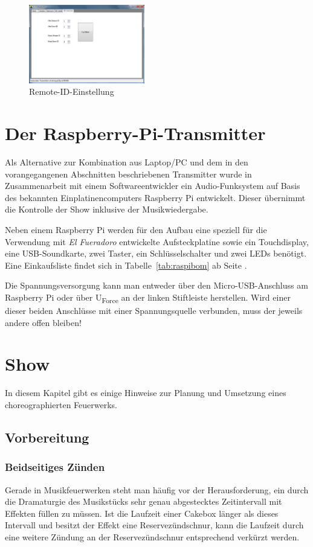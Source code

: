 \documentclass[paper=a4, parskip, numbers=noenddot, toc=listof, headsepline]{scrbook}
\newcommand{\anlage}{\emph{El Fueradoro}}
\begin{document}
			\begin{figure}[!t]
				\centering
				\includegraphics[width=0.45\textwidth]{bilder/gui-remote}
				\caption{Remote-ID-Einstellung}
				\label{fig:gui-remote}
			\end{figure}

	\chapter{Der Raspberry-Pi-Transmitter}

		Als Alternative zur Kombination aus Laptop/PC und dem in den vorangegangenen Abschnitten beschriebenen Transmitter wurde in Zusammenarbeit mit einem Softwareentwickler ein Audio-Funksystem auf Basis des bekannten Einplatinencomputers Raspberry Pi entwickelt. Dieser übernimmt die Kontrolle der Show inklusive der Musikwiedergabe.

		Neben einem Raspberry Pi werden für den Aufbau eine speziell für die Verwendung mit {\anlage} entwickelte Aufsteckplatine sowie ein Touchdisplay, eine USB-Soundkarte, zwei Taster, ein Schlüsselschalter und zwei LEDs benötigt. Eine Einkaufsliste findet sich in Tabelle~\ref{tab:raspibom} ab Seite \pageref{tab:raspibom}.

		Die Spannungsversorgung kann man entweder über den Micro-USB-Anschluss am Raspberry Pi oder über U\textsubscript{Force} an der linken Stiftleiste herstellen. Wird einer dieser beiden Anschlüsse mit einer Spannungsquelle verbunden, muss der jeweils andere offen bleiben!

	\chapter{Show}
		In diesem Kapitel gibt es einige Hinweise zur Planung und Umsetzung eines choreographierten Feuerwerks.
		\section{Vorbereitung}

			\subsection{Beidseitiges Zünden}
				Gerade in Musikfeuerwerken steht man häufig vor der Herausforderung, ein durch die Dramaturgie des Musikstücks sehr genau abgestecktes Zeitintervall mit Effekten füllen zu müssen. Ist die Laufzeit einer Cakebox länger als dieses Intervall und besitzt der Effekt eine Reservezündschnur, kann die Laufzeit durch eine weitere Zündung an der Reservezündschnur entsprechend verkürzt werden.
\end{document}
